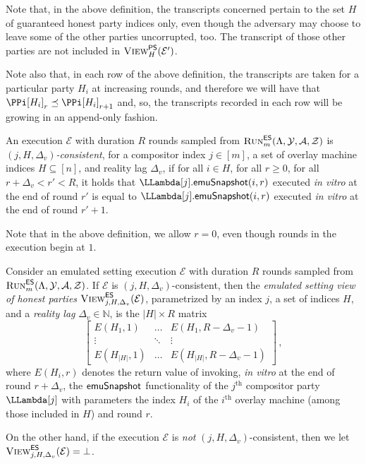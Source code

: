 Note that, in the above definition, the transcripts concerned pertain to the
set $H$ of guaranteed honest party indices only, even though the adversary may choose
to leave some of the other parties uncorrupted, too. The transcript of
those other parties are not included in $\textsc{View}^{\textsf{PS}}_H(\mathcal{E}')$.

Note also that, in each row of the above definition, the transcripts
are taken for a particular party $H_i$ at increasing rounds, and therefore
we will have that $\PPi[H_i]_r \preceq \PPi[H_i]_{r+1}$ and, so, the transcripts
recorded in each row will be growing in an append-only fashion.

\begin{definition}
  An execution $\mathcal{E}$ with duration $R$ rounds sampled from
  $\textsc{Run}^{\textsf{ES}}_m(\Lambda, \mathcal{Y}, \mathcal{A}, \mathcal{Z})$
  is \emph{$(j,H,\Delta_v)$-co\-nsistent},
  for a compositor index $j \in [m]$,
  a set of overlay machine indices $H \subseteq [n]$,
  and reality lag $\Delta_v$,
  if
  for all $i \in H$, for all $r \geq 0$,
  for all $r + \Delta_v < r' < R$,
  it holds that
  $\LLambda[j].\emulationSnapshot(i, r)$ executed \emph{in vitro} at the end of round $r'$
  is equal to
  $\LLambda[j].\emulationSnapshot(i, r)$ executed \emph{in vitro} at the end of round $r' + 1$.
\end{definition}

Note that in the above definition, we allow $r = 0$, even though rounds
in the execution begin at $1$.

\begin{definition}
  Consider an emulated setting execution $\mathcal{E}$ with duration $R$ rounds
  sampled from $\textsc{Run}^{\textsf{ES}}_m(\Lambda, \mathcal{Y}, \mathcal{A}, \mathcal{Z})$.
  If $\mathcal{E}$ is $(j,H,\Delta_v)$-consistent, then
  the \emph{emulated setting view of honest parties} $\textsc{View}^{\textsf{ES}}_{j,H,\Delta_v}(\mathcal{E})$,
  parametrized by an index $j$, a set of indices $H$, and a \emph{reality lag} $\Delta_v \in \mathbb{N}$,
  is the $|H| \times R$ matrix
  \[
  \begin{bmatrix}
    E(H_1, 1) & \ldots & E(H_1, R - \Delta_v - 1)\\
       \vdots & \ddots & \vdots \\
    E(H_{|H|}, 1) & \ldots & E(H_{|H|}, R - \Delta_v - 1)
  \end{bmatrix}\,,
  \]
  where $E(H_i, r)$ denotes the return value of invoking,
  \emph{in vitro} at the end of round $r + \Delta_v$,
  the $\textsf{emuSnapshot}$ functionality of the $j^\text{th}$ compositor party $\LLambda[j]$
  with parameters the index $H_i$ of the $i^\text{th}$ overlay machine (among those
  included in $H$) and round $r$.

  On the other hand, if the execution $\mathcal{E}$ is \emph{not} $(j,H,\Delta_v)$-consistent, then
  we let $\textsc{View}^{\textsf{ES}}_{j,H,\Delta_v}(\mathcal{E}) = \bot$.
\end{definition}

